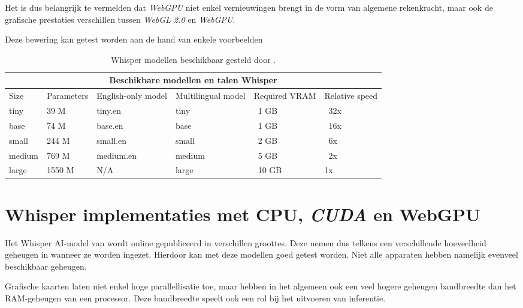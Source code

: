 \bigbreak{}

Het is dus belangrijk te vermelden dat \textit{WebGPU} niet enkel vernieuwingen brengt in de vorm van algemene rekenkracht, maar ook de grafische prestaties verschillen tussen \textit{WebGL 2.0} en \textit{WebGPU}. 

\bigbreak{}

Deze bewering kan getest worden aan de hand van enkele voorbeelden

\break{}

\begin{table}
    \begin{tabular}{ |p{1.5cm}|p{2.5cm}|p{3cm}|p{3cm}|p{2cm}|p{2cm}|  }
        \hline
        \multicolumn{6}{|c|}{Beschikbare modellen en talen Whisper} \\
        \hline
            Size& Parameters & English-only model & Multilingual model & Required VRAM & Relative speed\\
        \hline
            tiny&       39 M    &tiny.en    & tiny& ~1 GB& ~32x     \\
            base &      74 M	&base.en    & base & ~1 GB & ~16x   \\
            small &     244 M	&small.en   & small & ~2 GB & ~6x   \\
            medium &    769 M	&medium.en  & medium & ~5 GB & ~2x  \\
            large &     1550 M	&N/A        & large & ~10 GB& 	1x  \\
        \hline
    \end{tabular}
    \caption{Whisper modellen beschikbaar gesteld door \textcite{OpenAI2023}.}
    \label{tab:OpenAIWhisperModels}
\end{table}

\section{Whisper implementaties met CPU, \textit{CUDA} en WebGPU}%
\label{sec:whispertest}

Het Whisper AI-model van \textcite{OpenAI2023} wordt online gepubliceerd in verschillen groottes. Deze nemen dus telkens een verschillende hoeveelheid geheugen in wanneer ze worden ingezet. Hierdoor kan met deze modellen goed getest worden. Niet alle apparaten hebben namelijk evenveel beschikbaar geheugen. 

\bigbreak{}

Grafische kaarten laten niet enkel hoge parallellisatie toe, maar hebben in het algemeen ook een veel hogere geheugen bandbreedte dan het RAM-geheugen van een processor. Deze bandbreedte speelt ook een rol bij het uitvoeren van inferentie.

